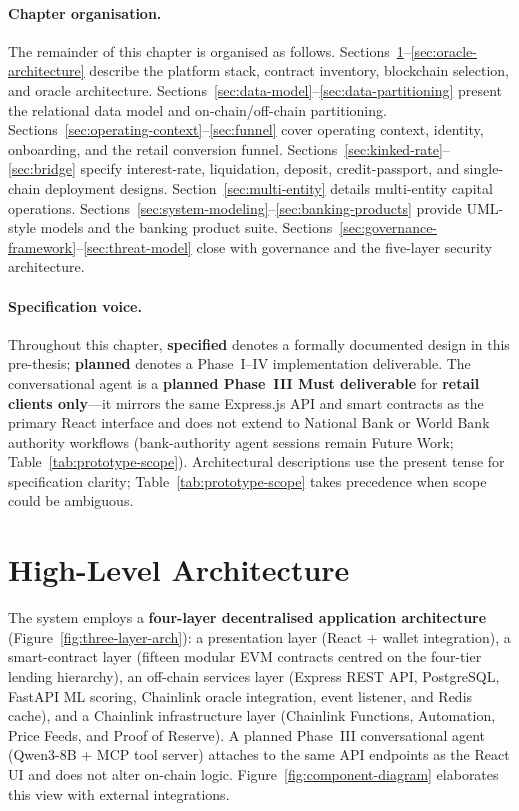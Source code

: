 \documentclass[12pt,a4paper]{report}
\begin{document}
\paragraph{Chapter organisation.}
The remainder of this chapter is organised as follows. Sections~\ref{sec:high-level-arch}--\ref{sec:oracle-architecture} describe the platform stack, contract inventory, blockchain selection, and oracle architecture. Sections~\ref{sec:data-model}--\ref{sec:data-partitioning} present the relational data model and on-chain/off-chain partitioning. Sections~\ref{sec:operating-context}--\ref{sec:funnel} cover operating context, identity, onboarding, and the retail conversion funnel. Sections~\ref{sec:kinked-rate}--\ref{sec:bridge} specify interest-rate, liquidation, deposit, credit-passport, and single-chain deployment designs. Section~\ref{sec:multi-entity} details multi-entity capital operations. Sections~\ref{sec:system-modeling}--\ref{sec:banking-products} provide UML-style models and the banking product suite. Sections~\ref{sec:governance-framework}--\ref{sec:threat-model} close with governance and the five-layer security architecture.

\paragraph{Specification voice.}
Throughout this chapter, \textbf{specified} denotes a formally documented design in this pre-thesis; \textbf{planned} denotes a Phase~I--IV implementation deliverable. The conversational agent is a \textbf{planned Phase~III Must deliverable} for \textbf{retail clients only}---it mirrors the same Express.js API and smart contracts as the primary React interface and does not extend to National Bank or World Bank authority workflows (bank-authority agent sessions remain Future Work; Table~\ref{tab:prototype-scope}). Architectural descriptions use the present tense for specification clarity; Table~\ref{tab:prototype-scope} takes precedence when scope could be ambiguous.

\section{High-Level Architecture}
\label{sec:high-level-arch}

The system employs a \textbf{four-layer decentralised application architecture} (Figure~\ref{fig:three-layer-arch}): a presentation layer (React + wallet integration), a smart-contract layer (fifteen modular EVM contracts centred on the four-tier lending hierarchy), an off-chain services layer (Express REST API, PostgreSQL, FastAPI ML scoring, Chainlink oracle integration, event listener, and Redis cache), and a Chainlink infrastructure layer (Chainlink Functions, Automation, Price Feeds, and Proof of Reserve). A planned Phase~III conversational agent (Qwen3-8B + MCP tool server) attaches to the same API endpoints as the React UI and does not alter on-chain logic. Figure~\ref{fig:component-diagram} elaborates this view with external integrations.
\end{document}
